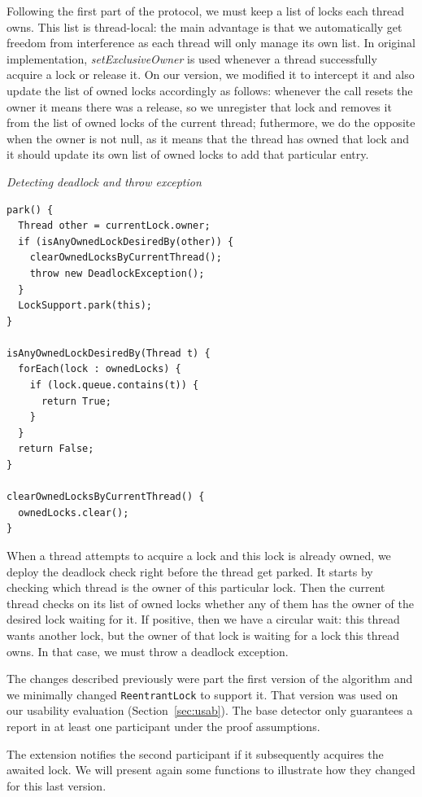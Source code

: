 Following the first part of the protocol, we must keep a list of locks each thread owns.
This list is thread-local: the main advantage is that we automatically get freedom from interference as each thread will only manage its own list.
In original implementation, \emph{setExclusiveOwner} is used whenever a thread successfully acquire a lock or release it.
On our version, we modified it to intercept it and also update the list of owned locks accordingly as follows:
whenever the call resets the owner it means there was a release, so we unregister that lock and removes it from the list of owned locks of the current thread;
futhermore, we do the opposite when the owner is not null, as it means that the thread has owned that lock and it should update its own list of owned locks to add that particular entry.

\medskip
\noindent
{\it Detecting deadlock and throw exception}
\begin{verbatim}
park() {
  Thread other = currentLock.owner;
  if (isAnyOwnedLockDesiredBy(other)) {
    clearOwnedLocksByCurrentThread();
    throw new DeadlockException();
  }
  LockSupport.park(this);
}

isAnyOwnedLockDesiredBy(Thread t) {
  forEach(lock : ownedLocks) {
    if (lock.queue.contains(t)) {
      return True;
    }
  }
  return False;
}

clearOwnedLocksByCurrentThread() {
  ownedLocks.clear();
}
\end{verbatim}

When a thread attempts to acquire a lock and this lock is already owned, we deploy the deadlock check right before the thread get parked.
It starts by checking which thread is the owner of this particular lock.
Then the current thread checks on its list of owned locks whether any of them has the owner of the desired lock waiting for it.
If positive, then we have a circular wait: this thread wants another lock, but the owner of that lock is waiting for a lock this thread owns.
In that case, we must throw a deadlock exception.

The changes described previously were part the first version of the algorithm and we minimally changed  {\tt ReentrantLock} to support it.
That version was used on our usability evaluation (Section~\ref{sec:usab}).
The base detector only guarantees a report in at least one participant under the proof assumptions.

The extension notifies the second participant if it subsequently acquires the awaited lock.
We will present again some functions to illustrate how they changed for this last version.

